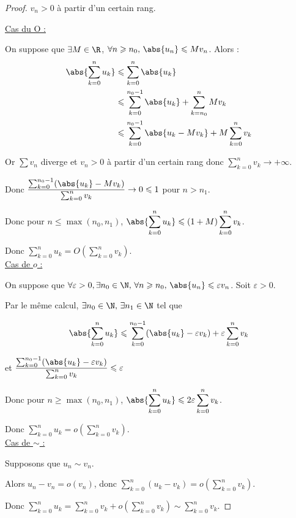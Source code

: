 \begin{proof} $v_n > 0$ à partir d'un certain rang.
    
    \uline{Cas du O :}

    \svspace On suppose que $\exists M \in \R$, $\forall n \geqslant n_0, \, \abs{u_n} \leqslant M v_n$.
    Alors :
    \begin{align*}
        \abs{\sum_{k = 0 }^{n } u_k} & \leqslant \sum_{k=0 }^{n } \abs{u_k} \\
                                    & \leqslant \sum_{k = 0}^{n_0 - 1} \abs{u_k} + \sum_{k = n_0}^{n } M v_k \\
                                    & \leqslant \sum_{k = 0}^{n_0 - 1} \abs{u_k - M v_k} + M \sum_{k = 0}^{n } v_k \\
    \end{align*} 

    Or $\sum v_n$ diverge et $v_n > 0$ à partir d'un certain rang donc $\sum_{k = 0}^{n } v_k \to + \infty$.

    \svspace Donc $\displaystyle \frac{\sum_{k = 0 }^{n_0 - 1} (\abs{u_k} - M v_k)}{\sum_{k = 0}^n v_k} \to 0 \leqslant 1$ pour $n > n_1$.

    \svspace Donc pour $\displaystyle n \leqslant \max(n_0, n_1)$, $\displaystyle \abs{\sum_{k = 0 }^{n } u_k} \leqslant \left( 1 + M \right) \sum_{k = 0}^{n } v_k$.

    Donc $\displaystyle \sum_{k = 0}^{n } u_k = O\left( \sum_{k = 0}^{n } v_k \right)$. \\

    \uline{Cas de $o$ :}

    \svspace On suppose que $\forall \varepsilon > 0, \exists n_0 \in \N, \, \forall n \geqslant n_0, \, \abs{u_n} \leqslant \varepsilon v_n$.
    Soit $\varepsilon > 0$. 

    Par le même calcul, $\exists n_0 \in \N, \, \exists n_1 \in \N$ tel que 

    \[\abs{\sum_{k = 0 }^{n } u_k} \leqslant \sum_{k = 0}^{n_0 - 1} (\abs{u_k} - \varepsilon v_k) + \varepsilon \sum_{k = 0}^{n } v_k\]

    et $\displaystyle \frac{\sum_{k = 0 }^{n_0 - 1} (\abs{u_k} - \varepsilon v_k)}{\sum_{k = 0}^{n } v_k} \leqslant \varepsilon$ 

    \svspace Donc pour $n \geqslant \max(n_0, n_1)$, $\displaystyle \abs{\sum_{k = 0 }^{n } u_k} \leqslant 2 \varepsilon \sum_{k = 0}^{n } v_k$.

    Donc $\displaystyle \sum_{k = 0}^{n } u_k = o\left( \sum_{k = 0}^{n } v_k \right)$. \\

    \uline{Cas de $\sim$ :}

    \svspace Supposons que $u_n \sim v_n$.

    Alors $\displaystyle u_n - v_n = o(v_n)$, donc $\displaystyle \sum_{k = 0}^{n } (u_k - v_k) = o\left( \sum_{k = 0}^{n } v_k \right)$.

    Donc $\displaystyle \sum_{k = 0}^{n } u_k = \sum_{k = 0}^{n } v_k + o\left( \sum_{k = 0}^{n } v_k \right) \sim \sum_{k = 0}^{n } v_k$.
\end{proof} 

